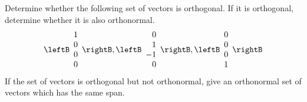 \begin{enumialphparenastyle}
\begin{ex} Determine whether the following set of vectors is orthogonal. If it is
orthogonal, determine whether it is also orthonormal.
\begin{equation*}
\leftB 
\begin{array}{c}
1 \\ 
0 \\ 
0 \\ 
0
\end{array}
\rightB ,\leftB 
\begin{array}{r}
0 \\ 
1 \\ 
-1 \\ 
0
\end{array}
\rightB ,\leftB 
\begin{array}{c}
0 \\ 
0 \\ 
0 \\ 
1
\end{array}
\rightB
\end{equation*}
If the set of vectors is orthogonal but not orthonormal, give an orthonormal
set of vectors which has the same span.
\end{ex}

\end{enumialphparenastyle}